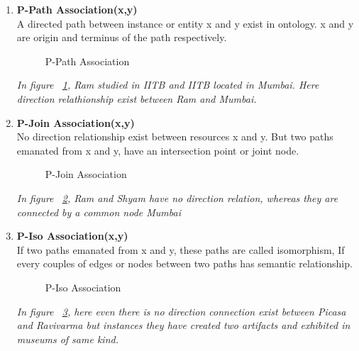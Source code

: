 \begin{enumerate}

\item{\textbf{P-Path Association(x,y)}}\\
	A directed path between instance or entity x and y exist in ontology. x and y are origin and terminus of the path respectively.

\begin{figure}[h]
\begin{center}
\end{center}
\caption{P-Path Association}
\label{fig:ppath}
\end{figure}

\textit{In figure ~\ref{fig:ppath}, Ram studied in IITB and IITB located in Mumbai. Here direction relathionship exist between Ram and Mumbai.}

\item{\textbf{P-Join Association(x,y)}}\\
	No direction relationship exist between resources x and y. But two paths emanated from x and y, have an intersection point or joint node.

\begin{figure}[h]
\begin{center}
\end{center}
\caption{P-Join Association}
\label{fig:pjoin}
\end{figure}

\textit{In figure ~\ref{fig:pjoin}, Ram and Shyam have no direction relation, whereas they are connected by a common node Mumbai}

\item{\textbf{P-Iso Association(x,y)}}\\
	If two paths emanated from x and y, these paths are called isomorphism, If every couples of edges or nodes between two paths has semantic relationship.	 

\begin{figure}[h]
\begin{center}
\end{center}
\caption{P-Iso Association}
\label{fig:piso}
\end{figure}

\textit{In figure ~\ref{fig:piso}, here even there is no direction connection exist between Picasa and Ravivarma but instances they have created two artifacts and exhibited in museums of same kind.}


\end{enumerate}
